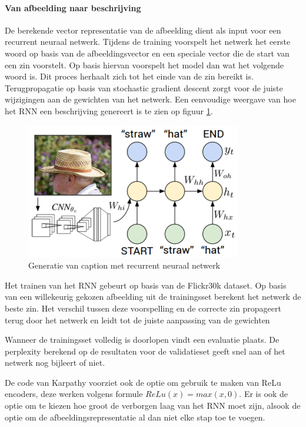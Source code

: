 \paragraph{Van afbeelding naar beschrijving}
De berekende vector representatie van de afbeelding dient als input voor een recurrent neuraal netwerk. Tijdens de training voorspelt het netwerk het eerste woord op basis van de afbeeldingsvector en een speciale vector die de start van een zin voorstelt. Op basis hiervan voorspelt het model dan wat het volgende woord is. Dit proces herhaalt zich tot het einde van de zin bereikt is. Terugpropagatie op basis van stochastic gradient descent zorgt voor de juiste wijzigingen aan de gewichten van het netwerk. Een eenvoudige weergave van hoe het RNN een beschrijving genereert is te zien op figuur \ref{fig:rnntraining}.

\begin{figure}[tb]
    \centering
    \includegraphics[width=0.5\linewidth]{Images/karpathy.PNG}
    \caption{Generatie van caption met recurrent neuraal netwerk}
\label{fig:rnntraining}
\end{figure}

Het trainen van het RNN gebeurt op basis van de Flickr30k dataset. 
Op basis van een willekeurig gekozen afbeelding uit de trainingsset berekent het netwerk de beste zin. Het verschil tussen deze voorspelling en de correcte zin propageert terug door het netwerk en leidt tot de juiste aanpassing van de gewichten

 Wanneer de trainingsset volledig is doorlopen vindt een evaluatie plaats. De perplexity berekend op de resultaten voor de validatieset geeft snel aan of het netwerk nog bijleert of niet. 

De code van Karpathy voorziet ook de optie om gebruik te maken van ReLu encoders, deze werken volgens formule $ReLu(x) = max(x,0)$. Er is ook de optie om te kiezen hoe groot de verborgen laag van het RNN moet zijn, alsook de optie om de afbeeldingsrepresentatie al dan niet elke stap toe te voegen.


